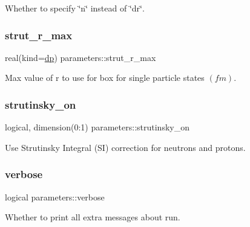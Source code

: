 Whether to specify \char`\"{}n\char`\"{} instead of \char`\"{}dr\char`\"{}. 

\mbox{\label{group__INPUT__PARS_ga0dd8e62aa4b777681ce98d7c88cafdf8}} 
\subsubsection{\texorpdfstring{strut\+\_\+r\+\_\+max}{strut\_r\_max}}
{\footnotesize\ttfamily real(kind=\mbox{\hyperlink{namespaceparameters_a52f8c6351fd79345d8811e065bcbbb37}{dp}}) parameters\+::strut\+\_\+r\+\_\+max}



Max value of r to use for box for single particle states $(fm)$. 

\mbox{\label{group__INPUT__PARS_gaad3b88a661482173813a2f76cba73b11}} 
\subsubsection{\texorpdfstring{strutinsky\+\_\+on}{strutinsky\_on}}
{\footnotesize\ttfamily logical, dimension(0\+:1) parameters\+::strutinsky\+\_\+on}



Use Strutinsky Integral (SI) correction for neutrons and protons. 

\mbox{\label{group__INPUT__PARS_ga552f372a0ff4dff467424c48bedd6b49}} 
\subsubsection{\texorpdfstring{verbose}{verbose}}
{\footnotesize\ttfamily logical parameters\+::verbose}



Whether to print all extra messages about run. 

